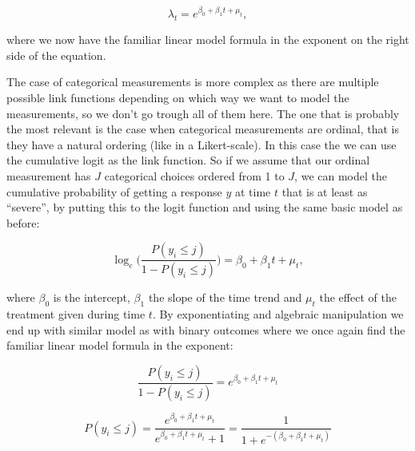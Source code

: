 \documentclass[12pt,a4paper,leqno]{report}
\theoremstyle{plain}
\theoremstyle{definition}
\theoremstyle{remark}
\begin{document}
\begin{def}\label{oneerror}
    \begin{equation}
        \lambda_t=e^{\beta_0 + \beta_1 t + \mu_t},
    \end{equation}
\end{def}where we now have the familiar linear model formula in the exponent on
the right side of the equation.

The case of categorical measurements is more complex as there are multiple
possible link functions depending on which way we want to model the
measurements, so we don't go trough all of them here. The one that is probably
the most relevant is the case when categorical measurements are ordinal, that is
they have a natural ordering (like in a Likert-scale). In this case the we can
use the cumulative logit as the link function. So if we assume that our ordinal
measurement has \(J\) categorical choices ordered from 1 to \(J\), we can model
the cumulative probability of getting a response \(y\) at time \(t\) that is at
least as ``severe'', by putting this to the logit function and using the same
basic model as before:

\begin{def}\label{oneerror}
    \begin{equation}
        \log_e\bigg({\frac{P(y_i \leq j)}{1 - P(y_i \leq j)}}\bigg)=\beta_0 + \beta_1 t + \mu_t,
    \end{equation}
\end{def}where \(\beta_0\) is the intercept, \(\beta_1\) the slope of the time
trend and \(\mu_t\) the effect of the treatment given during time \(t\). By
exponentiating and algebraic manipulation we end up with similar model as with
binary outcomes where we once again find the familiar linear model formula in
the exponent:

\begin{def}\label{}
    \begin{equation}\label{ord_exponentiating}
        \frac{P(y_i \leq j)}{1 - P(y_i \leq j)}=e^{\beta_0 + \beta_1 t + \mu_t}
    \end{equation}
\end{def}

\begin{def}\label{}
    \begin{equation}\label{ord_algmanipulation}
        P(y_i \leq j)=\frac{e^{\beta_0 + \beta_1 t + \mu_t}}{e^{\beta_0 + \beta_1 t + \mu_t}+1}=\frac{1}{1+e^{-(\beta_0 + \beta_1 t + \mu_t)}}
    \end{equation}
\end{def}
\end{document}
